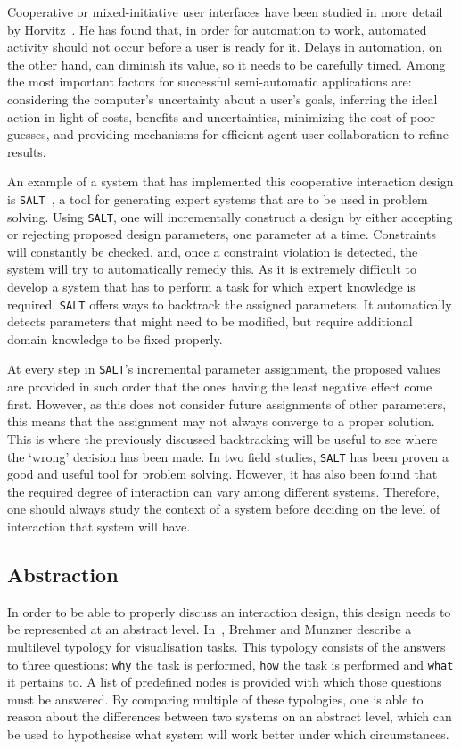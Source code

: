 Cooperative or mixed-initiative user interfaces have been studied in more detail by Horvitz~\cite{horvitz1999principles}. He has found that, in order for automation to work, automated activity should not occur before a user is ready for it. Delays in automation, on the other hand, can diminish its value, so it needs to be carefully timed. Among the most important factors for successful semi-automatic applications are: considering the computer's uncertainty about a user's goals, inferring the ideal action in light of costs, benefits and uncertainties, minimizing the cost of poor guesses, and providing mechanisms for efficient agent-user collaboration to refine results.

An example of a system that has implemented this cooperative interaction design is \verb|SALT|~\cite{marcus1987taking}, a tool for generating expert systems that are to be used in problem solving. Using \verb|SALT|, one will incrementally construct a design by either accepting or rejecting proposed design parameters, one parameter at a time. Constraints will constantly be checked, and, once a constraint violation is detected, the system will try to automatically remedy this. As it is extremely difficult to develop a system that has to perform a task for which expert knowledge is required, \verb|SALT| offers ways to backtrack the assigned parameters. It automatically detects parameters that might need to be modified, but require additional domain knowledge to be fixed properly.

At every step in \verb|SALT|'s incremental parameter assignment, the proposed values are provided in such order that the ones having the least negative effect come first. However, as this does not consider future assignments of other parameters, this means that the assignment may not always converge to a proper solution. This is where the previously discussed backtracking will be useful to see where the `wrong' decision has been made. In two field studies, \verb|SALT| has been proven a good and useful tool for problem solving. However, it has also been found that the required degree of interaction can vary among different systems. Therefore, one should always study the context of a system before deciding on the level of interaction that system will have.

\subsection{Abstraction}
In order to be able to properly discuss an interaction design, this design needs to be represented at an abstract level. In~\cite{brehmer2013multi}, Brehmer and Munzner describe a multilevel typology for visualisation tasks. This typology consists of the answers to three questions: \verb|why| the task is performed, \verb|how| the task is performed and \verb|what| it pertains to. A list of predefined nodes is provided with which those questions must be answered. By comparing multiple of these typologies, one is able to reason about the differences between two systems on an abstract level, which can be used to hypothesise what system will work better under which circumstances.


